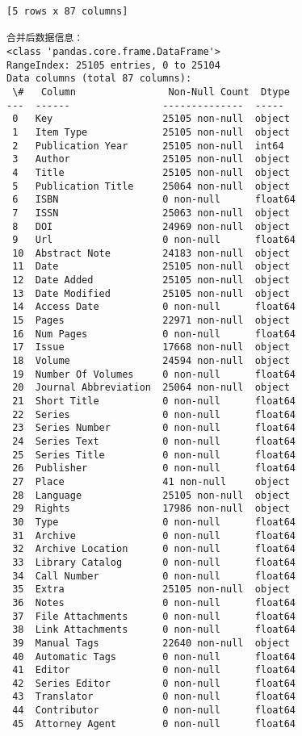 \documentclass[11pt]{article}
\begin{document}
\begin{Verbatim}[commandchars=\\\{\}]
[5 rows x 87 columns]

合并后数据信息：
<class 'pandas.core.frame.DataFrame'>
RangeIndex: 25105 entries, 0 to 25104
Data columns (total 87 columns):
 \#   Column                Non-Null Count  Dtype
---  ------                --------------  -----
 0   Key                   25105 non-null  object
 1   Item Type             25105 non-null  object
 2   Publication Year      25105 non-null  int64
 3   Author                25105 non-null  object
 4   Title                 25105 non-null  object
 5   Publication Title     25064 non-null  object
 6   ISBN                  0 non-null      float64
 7   ISSN                  25063 non-null  object
 8   DOI                   24969 non-null  object
 9   Url                   0 non-null      float64
 10  Abstract Note         24183 non-null  object
 11  Date                  25105 non-null  object
 12  Date Added            25105 non-null  object
 13  Date Modified         25105 non-null  object
 14  Access Date           0 non-null      float64
 15  Pages                 22971 non-null  object
 16  Num Pages             0 non-null      float64
 17  Issue                 17668 non-null  object
 18  Volume                24594 non-null  object
 19  Number Of Volumes     0 non-null      float64
 20  Journal Abbreviation  25064 non-null  object
 21  Short Title           0 non-null      float64
 22  Series                0 non-null      float64
 23  Series Number         0 non-null      float64
 24  Series Text           0 non-null      float64
 25  Series Title          0 non-null      float64
 26  Publisher             0 non-null      float64
 27  Place                 41 non-null     object
 28  Language              25105 non-null  object
 29  Rights                17986 non-null  object
 30  Type                  0 non-null      float64
 31  Archive               0 non-null      float64
 32  Archive Location      0 non-null      float64
 33  Library Catalog       0 non-null      float64
 34  Call Number           0 non-null      float64
 35  Extra                 25105 non-null  object
 36  Notes                 0 non-null      float64
 37  File Attachments      0 non-null      float64
 38  Link Attachments      0 non-null      float64
 39  Manual Tags           22640 non-null  object
 40  Automatic Tags        0 non-null      float64
 41  Editor                0 non-null      float64
 42  Series Editor         0 non-null      float64
 43  Translator            0 non-null      float64
 44  Contributor           0 non-null      float64
 45  Attorney Agent        0 non-null      float64

\end{Verbatim}
\end{document}
